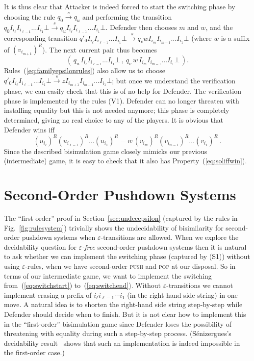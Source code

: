 \documentclass[11pt]{article}
\newcommand{\push}{\textsc{push}\xspace}
\newcommand{\pop}{\textsc{pop}\xspace}
\newcommand{\goes}[1]{\ensuremath{\stackrel{#1}{\longrightarrow}}}
\begin{document}
It is thus clear that Attacker is indeed forced to start 
the switching phase by choosing the rule $q_0\goes{s}q_u$
and performing the transition 
$q_0I_{i_\ell}I_{i_{\ell-1}}\ldots I_{i_1}\bot\goes{s}
q_uI_{i_\ell}I_{i_{\ell-1}}\ldots I_{i_1}\bot$.
Defender then chooses $m$ and $w$,
and the corresponding transition
$q'_0I_{i_\ell}I_{i_{\ell-1}}\ldots I_{i_1}\bot
\goes{s}
q_v wI_{i_m}I_{i_{m-1}}\ldots I_{i_1}\bot$
(where $w$ is a suffix of 
$(v_{i_{m+1}})^R$). 
The next current pair thus becomes
\begin{equation*}(\,q_u\, I_{i_\ell}I_{i_{\ell-1}}\ldots I_{i_1}\bot\,,
\ q_v\, w\,I_{i_m}I_{i_{m-1}}\ldots I_{i_1}\bot\,). 
\end{equation*}
Rules~(\ref{eq:familyepsilonrules}) also allow us to choose
$q'_0I_{i_\ell}I_{i_{\ell-1}}\ldots I_{i_1}\bot
\goes{s}
z I_{i_{m+1}}I_{i_{m-1}}\ldots I_{i_1}\bot$;
but once we understand the verification phase, 
we can easily check that this is of no help for Defender.
The verification phase is implemented by the rules (V1).
Defender can no longer threaten with installing equality but this is
not needed anymore; this phase is completely determined,
giving no real choice to any of the players.  
It is obvious that Defender  wins iff
\begin{equation*}(u_{i_{\ell}})^R(u_{i_{\ell-1}})^R\ldots (u_{i_{1}})^R=
w\,(v_{i_{m}})^R(v_{i_{m-1}})^R\ldots (v_{i_{1}})^R\ .
\end{equation*}
Since the described
bisimulation game closely mimicks our previous (intermediate) game,
it is easy to check that it also has Property~(\ref{eq:soliffwin}).








\section{Second-Order Pushdown Systems}\label{sec:undecsecondorder}

The ``first-order'' proof in Section~\ref{sec:undecepsilon}
(captured by the rules in Fig.~\ref{fig:rulesystem})
trivially shows the undecidability of bisimilarity for second-order
pushdown systems when 
$\varepsilon$-transitions are allowed.
When we explore the decidability question for
\emph{$\varepsilon$-free}
second-order pushdown systems then
it is natural to ask whether
we can implement the switching phase
(captured by (S1))
without using $\varepsilon$-rules, when
we have second-order \push and \pop at
our disposal.
So in terms of our intermediate game, we want to implement 
the switching from~(\ref{eq:switchstart}) 
to~(\ref{eq:switchend}). 
Without $\varepsilon$-transitions  we cannot implement erasing 
a prefix of $i_\ell i_{\ell-1}\cdots i_1$ 
(in the right-hand side string) in one move.
A natural idea is to shorten the right-hand side string 
step-by-step while Defender should 
decide when to finish. But it is not clear how 
to implement this in the ``first-order'' 
bisimulation game since Defender 
loses the possibility
of threatening with equality during such a step-by-step process. 
(S\'enizergues's decidability 
result~\cite{Senizergues:SIAM:05} shows that 
such an implementation is
indeed impossible in the first-order case.)
\end{document}
